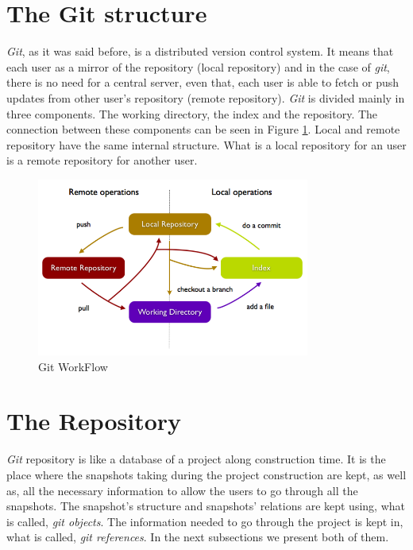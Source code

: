 \section{The Git structure}
\emph{Git}, as it was said before, is a distributed version control system.
It means that each user as a mirror of the repository (local
repository) and in the case of
\emph{git}, there is no need for a central server, even that, each user is able to
fetch or push updates from other user's repository (remote repository).
\emph{Git} is divided mainly in three components. The working directory,
the index and the repository. The connection between these components
can be seen in Figure \ref{fig:git_structure}. Local and remote
repository have the same internal structure. What is a local
repository for an user is a remote repository for another user.

\begin{figure}[!t]
   \centering
   \includegraphics[width=0.8\textwidth]{images/git_workflow.png}
   \caption{Git WorkFlow}\label{fig:git_structure}
\end{figure}

\section{The Repository}
\emph{Git} repository is like a database of a project along construction time. It is
the place where the snapshots taking during the project construction
are kept, as well as, all the necessary information to
allow the users to go through all the snapshots. The snapshot's
structure and snapshots' relations are kept using, what is called, \emph{git
objects}. The information needed to go through the project is kept in,
what is called, \emph{git references}. In the next subsections we
present both of them.


